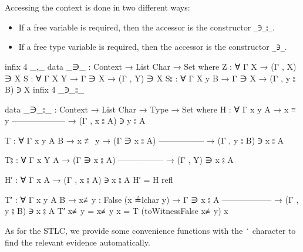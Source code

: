 \documentclass[logo,bsc,singlespacing,parskip,online]{infthesis}
\renewenvironment{code}{\mintedcopy[breaklines,breaksymbolleft=\;]{agda}}{\endmintedcopy}
\begin{document}
Accessing the context is done in two different ways:
\begin{itemize}
  \item If a free variable is required, then the accessor is the constructor \texttt{\_∋\_⦂\_}.
  \item If a free type variable is required, then the accessor is the constructor \texttt{\_∋\_}.
\end{itemize}
\begin{code}
  infix 4 _,_
  data _∋_ : Context → List Char → Set where
    Z : ∀ {Γ X} → (Γ , X) ∋ X
    S : ∀ {Γ X Y} → Γ ∋ X → (Γ , Y) ∋ X
    S⦂ : ∀ {Γ X y B} → Γ ∋ X → (Γ , y ⦂ B) ∋ X
  infix 4 _∋_⦂_

  data _∋_⦂_ : Context → List Char → Type → Set where
    H : ∀ {Γ x y A}
      → x ≡ y
        --------------------
      → (Γ , x ⦂ A) ∋ y ⦂ A

    T : ∀ {Γ x y A B}
      → x ≢ y
      → (Γ ∋ x ⦂ A)
        -----------------
      → (Γ , y ⦂ B) ∋ x ⦂ A

    T⦂ : ∀ {Γ x Y A}
      → (Γ ∋ x ⦂ A)
        -----------------
      → (Γ , Y) ∋ x ⦂ A

  H′ : ∀ {Γ x A} → (Γ , x ⦂ A) ∋ x ⦂ A
  H′ = H refl

  T′ : ∀ {Γ x y A B}
    → {x≢y : False (x ≟lchar y)}
    → Γ ∋ x ⦂ A
      ------------------
    → (Γ , y ⦂ B) ∋ x ⦂ A
  T′ { x≢y = x≢y } x = T (toWitnessFalse x≢y) x
\end{code}

As for the STLC, we provide some convenience functions with the \texttt{′} character to find the
relevant evidence automatically.
\end{document}
